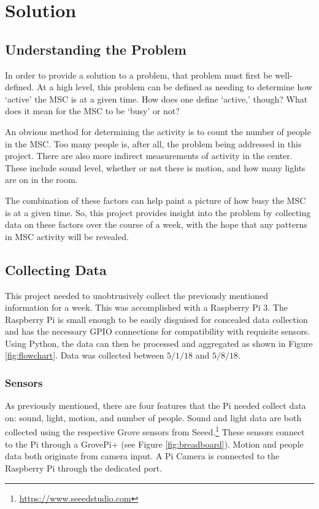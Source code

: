 
\section{Solution}
\label{sec:solution}

\subsection{Understanding the Problem}
In order to provide a solution to a problem, that problem must first be well-defined. At a high level, this problem can be defined as needing to determine how `active' the MSC is at a given time. How does one define `active,' though? What does it mean for the MSC to be `busy' or not?

An obvious method for determining the activity is to count the number of people in the MSC. Too many people is, after all, the problem being addressed in this project. There are also more indirect measurements of activity in the center. These include sound level, whether or not there is motion, and how many lights are on in the room.

The combination of these factors can help paint a picture of how busy the MSC is at a given time. So, this project provides insight into the problem by collecting data on these factors over the course of a week, with the hope that any patterns in MSC activity will be revealed.

\subsection{Collecting Data}
This project needed to unobtrusively collect the previously mentioned information for a week. This was accomplished with a Raspberry Pi 3. The Raspberry Pi is small enough to be easily disguised for concealed data collection and has the necessary GPIO connections for compatibility with requisite sensors. Using Python, the data can then be processed and aggregated as shown in Figure \ref{fig:flowchart}. Data was collected between $5/1/18$ and $5/8/18$.

\subsubsection{Sensors}
As previously mentioned, there are four features that the Pi needed collect data on: sound, light, motion, and number of people. Sound and light data are both collected using the respective Grove sensors from Seeed.\footnote{\url{https://www.seeedstudio.com}} These sensors connect to the Pi through a GrovePi+ (see Figure \ref{fig:breadboard}). Motion and people data both originate from camera input. A Pi Camera is connected to the Raspberry Pi through the dedicated port.

